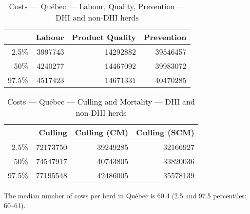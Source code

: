 \documentclass{article}\usepackage[]{graphicx}\usepackage[]{color}
\begin{document}
\begin{table}[ht]
\centering
\begin{tabular}{rrrr}
  \hline
 & Labour & Product Quality & Prevention \\ 
  \hline
2.5\% & 3997743 & 14292882 & 39546457 \\ 
  50\% & 4240277 & 14467092 & 39983072 \\ 
  97.5\% & 4517423 & 14671331 & 40470285 \\ 
   \hline
\end{tabular}
\caption{Costs --- Québec --- Labour, Quality, Prevention --- DHI and non-DHI herds} 
\label{tab:quebec2:b}
\end{table}
\begin{table}[ht]
\centering
\begin{tabular}{rrrr}
  \hline
 & Culling & Culling (CM) & Culling (SCM) \\ 
  \hline
2.5\% & 72173750 & 39249285 & 32166927 \\ 
  50\% & 74547917 & 40743805 & 33820036 \\ 
  97.5\% & 77195548 & 42486005 & 35578139 \\ 
   \hline
\end{tabular}
\caption{Costs --- Québec --- Culling and Mortality --- DHI and non-DHI herds} 
\label{tab:quebec2:c}
\end{table}


The median number of cows per herd in Québec is 60.4 (2.5 and 97.5 percentiles: 60--61).
\clearpage
\end{document}
